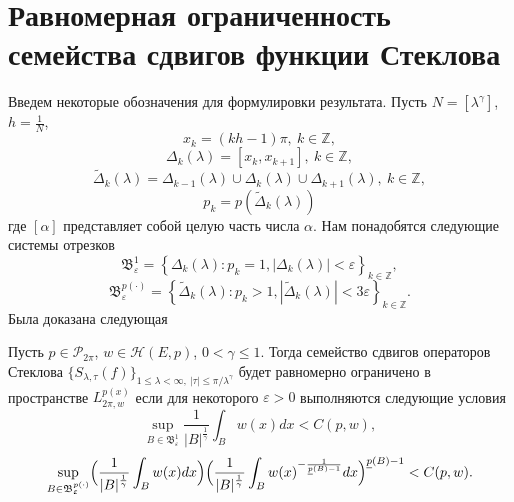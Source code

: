 \section{Равномерная ограниченность семейства сдвигов функции Стеклова}
Введем некоторые обозначения для формулировки результата. Пусть $N=\left[\lambda^\gamma\right]$, $h=\frac1N$,
\begin{equation}\label{xkknots}
  x_k=(kh-1)\pi,\ k\in\mathbb{Z},%
\end{equation}
\begin{equation*}
\Delta_k(\lambda)=[x_k,x_{k+1}],\ k\in\mathbb{Z},
\end{equation*}
\begin{equation*}
\tilde{\Delta}_k(\lambda)=\Delta_{k-1}(\lambda)
\cup\Delta_k(\lambda)\cup\Delta_{k+1}(\lambda),\ k\in\mathbb{Z},
\end{equation*}
\begin{equation}\label{skessinf}
  p_k=p(\tilde{\Delta}_k(\lambda))%
\end{equation}
где $[\alpha]$ представляет собой целую часть числа $\alpha$.
Нам понадобятся следующие системы отрезков
$$\mathfrak{B}_{\varepsilon}^1=\left\{\Delta_k(\lambda):p_k=1,|\Delta_k(\lambda)|<\varepsilon\right\}_{k\in\mathbb{Z}},$$
$$\mathfrak{B}_{\varepsilon}^{p(\cdot)}=\left\{\tilde{\Delta}_k(\lambda):p_k>1,|\tilde{\Delta}_k(\lambda)|<3\varepsilon\right\}_{k\in\mathbb{Z}}.$$
Была доказана следующая

\begin{theorem}
  Пусть $p\in\mathcal{ P}_{2\pi}$, $w\in \mathcal{ H}(E,p)$, $0<\gamma\le1$. Тогда семейство сдвигов операторов Стеклова $\{S_{\lambda,\tau}(f)\}_{1\le\lambda<\infty,\ |\tau|\le \pi/{\lambda^\gamma}}$ будет равномерно ограничено в пространстве $L^{p(x)}_{2\pi,w}$ если для некоторого $\varepsilon>0$ выполняются следующие условия
    \begin{equation*}%
      \sup_{B\in\mathfrak{B}_{\varepsilon}^1}\frac1{|B|^{\frac1\gamma}}\int_Bw(x)dx<C(p,w),
    \end{equation*}
    \begin{equation*}%
    \sup_{B\in\mathfrak{B}_{\varepsilon}^{p(\cdot)}}
    \Bigl(\frac{1}{|B|^{\frac1\gamma}}\int_B w(x)dx\Bigr) \Bigl(\frac{1}{|B|^{\frac1\gamma}}\int_B w(x)^{-\frac{1}{\underline{p}(B)-1}}dx \Bigr)^{\underline{p}(B)-1} < C(p,w).
    \end{equation*}
\end{theorem}


